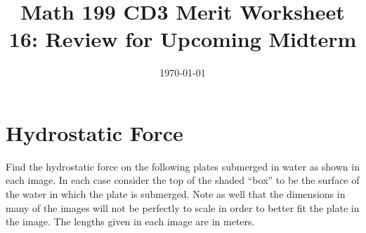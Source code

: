 

\usepackage{fullpage,amsmath,amssymb,amsthm}

\newcommand{\D}{\displaystyle}

\title{Math 199 CD3 Merit Worksheet 16: Review for Upcoming Midterm}
\date{\today}




\maketitle

\section{Hydrostatic Force}

Find the hydrostatic force on the following plates submerged in water as shown in each image. In each case consider the top of the shaded “box” to be the surface of the water in which the plate is submerged. Note as well that the dimensions in many of the images will not be perfectly to scale in order to better fit the plate in the image. The lengths given in each image are in meters.
